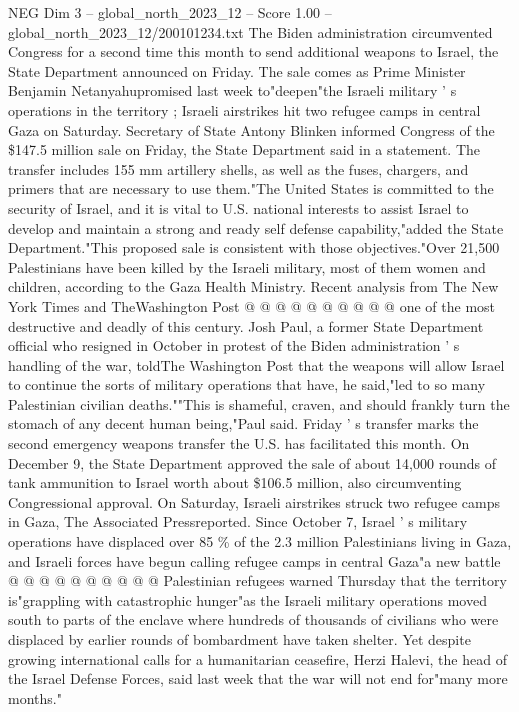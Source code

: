 \begin{textsample}{NEG Dim 3 – global\_north\_2023\_12 – Score 1.00 – global\_north\_2023\_12/200101234.txt}  \label{ex:f3_neg_195}
The Biden administration circumvented Congress for a second time this month to send additional weapons to Israel, the State Department announced on Friday.
The sale comes as Prime Minister Benjamin Netanyahupromised last week to"deepen"the Israeli military ' s operations in the territory ; Israeli airstrikes hit two refugee camps in central Gaza on Saturday.
Secretary of State Antony Blinken informed Congress of the \$147.5 million sale on Friday, the State Department said in a statement.
The transfer includes 155 mm artillery shells, as well as the fuses, chargers, and primers that are necessary to use them."The United States is committed to the security of Israel, and it is vital to U.S. national interests to assist Israel to develop and maintain a strong and ready self defense capability,"added the State Department."This proposed sale is consistent with those objectives."Over 21,500 Palestinians have been killed by the Israeli military, most of them women and children, according to the Gaza Health Ministry.
Recent analysis from The New York Times and TheWashington Post @ @ @ @ @ @ @ @ @ @ one of the most destructive and deadly of this century.
Josh Paul, a former State Department official who resigned in October in protest of the Biden administration ' s handling of the war, toldThe Washington Post that the weapons will allow Israel to continue the sorts of military operations that have, he said,"led to so many Palestinian civilian deaths.""This is shameful, craven, and should frankly turn the stomach of any decent human being,"Paul said.
Friday ' s transfer marks the second emergency weapons transfer the U.S. has facilitated this month.
On December 9, the State Department approved the sale of about 14,000 rounds of tank ammunition to Israel worth about \$106.5 million, also circumventing Congressional approval.
On Saturday, Israeli airstrikes struck two refugee camps in Gaza, The Associated Pressreported.
Since October 7, Israel ' s military operations have displaced over 85 \% of the 2.3 million Palestinians living in Gaza, and Israeli forces have begun calling refugee camps in central Gaza"a new battle @ @ @ @ @ @ @ @ @ @ Palestinian refugees warned Thursday that the territory is"grappling with catastrophic hunger"as the Israeli military operations moved south to parts of the enclave where hundreds of thousands of civilians who were displaced by earlier rounds of bombardment have taken shelter.
Yet despite growing international calls for a humanitarian ceasefire, Herzi Halevi, the head of the Israel Defense Forces, said last week that the war will not end for"many more months."

\end{textsample}

